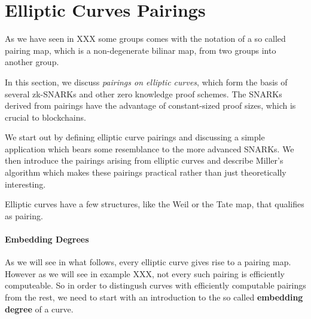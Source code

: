 
\section{Elliptic Curves Pairings} As we have seen in XXX some groups comes with the notation of a so called pairing map, which is a non-degenerate bilinar map, from two groups into another group.

In this section, we discuss \textit{pairings on elliptic curves}, which form the basis of several zk-SNARKs and other zero knowledge proof schemes. The SNARKs derived from pairings have the advantage of constant-sized proof sizes, which is crucial to blockchains.

We start out by defining elliptic curve pairings and discussing a simple application which bears some resemblance to the more advanced SNARKs. We then introduce the pairings arising from elliptic curves and describe Miller's algorithm which makes these pairings practical rather than just theoretically interesting.

Elliptic curves have a few structures, like the Weil or the Tate map, that qualifies as pairing.

\paragraph{Embedding Degrees}As we will see in what follows, every elliptic curve gives rise to a pairing map. However as we will see in example XXX, not every such pairing is efficiently computeable. So in order to distingush curves with efficiently computable pairings from the rest, we need to start with an introduction to the so called \textbf{embedding degree} of a curve.

